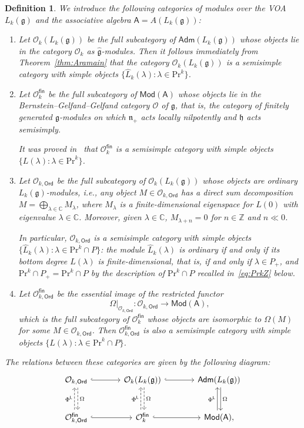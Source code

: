 \documentclass[12pt,a4paper,reqno]{amsart}
\numberwithin{equation}{section}
\newtheorem{definition}[theorem]{Definition}
\theoremstyle{definition}
\newcommand{\g}{\mathfrak{g}}
\newcommand{\C}{\mathbb{C}}
\newcommand{\Z}{\mathbb{Z}}
\def\O{\mathcal{O}}
\def\Ord{\mathsf{Ord}}
\def\Adm{\mathsf{Adm}}
\def\Mod{\mathsf{Mod}}
\def\fin{\mathsf{fin}}
\def\L{\mathsf{L}}
\def\Om{\Omega}
\def\Pr{\mathrm{Pr}}
\def\la{\lambda}
\def \h{\mathfrak{h}}
\def\A{\mathsf{A}}
\begin{document}
\begin{definition}\label{def:cats}
We introduce the following categories of modules over the VOA $L_k(\g)$ and the associative algebra $\A = A(L_k(\g))$:
\begin{enumerate}
    \item Let $\O_k(L_k(\g))$ be the full subcategory of $\Adm(L_k(\g))$ whose objects lie in the category $\O_k$ as $\hat{\g}$-modules.
Then it follows immediately from Theorem~\ref{thm:Aramain} that the category $\O_k(L_k(\g))$ is a semisimple category with simple objects $\{\hat{L}_k(\la):\la\in \Pr^k\}$.
\item Let $\O^\fin_k$ be the full subcategory of $\Mod(\A)$ whose objects lie in the Bernstein--Gelfand--Gelfand category $\O$ of $\g$, that is, the category of finitely generated $\g$-modules on which $\mathfrak{n}_+$ acts locally nilpotently and $\h$ acts semisimply.

It was proved in~\cite[Corollary 3.2]{AvE} that $\O^\fin_k$ is a semisimple category with simple objects $\{L(\la): \la\in \Pr^k\}$.
\item Let $\O_{k,\Ord}$ be the full subcategory of $\O_k(L_k(\g))$ whose objects are ordinary $L_k(\g)$-modules, i.e., any object $M\in \O_{k,\Ord}$ has a direct sum decomposition $M=\bigoplus_{\la\in \C} M_\la$, where $M_\la$ is a finite-dimensional eigenspace for $L(0)$ with eigenvalue $\la\in \C$. Moreover, given $\la\in \C$, $M_{\la+n}=0$ for $n\in \Z$ and $n\ll0$.

In particular, $\O_{k,\Ord}$ is a semisimple category with simple objects $\{\hat{L}_k(\la):\la\in \Pr^k\cap P\}$: the module $\hat{L}_k(\la)$ is ordinary if and only if its bottom degree $L(\la)$ is finite-dimensional, that is, if and only if $\la\in P_+$, and $\Pr^k\cap P_+=\Pr^k\cap P$ by the description of $\Pr^k\cap P$ recalled in~\eqref{eq:PrkZ} below.

\item Let $\O^{\fin}_{k,\Ord}$ be  the essential image of the restricted functor \[\Omega\big|_{\O_{k,\Ord}}\colon\mathcal O_{k,\Ord}\longrightarrow \Mod(\A),\]
which is the full subcategory of $\O^\fin_k$ whose objects are isomorphic to  $\Om(M)$ for some $M\in \O_{k,\Ord}$. Then $\O^{\fin}_{k,\Ord}$ is also a semisimple category with simple objects $\{L(\la): \la\in \Pr^k\cap P\} $.

\end{enumerate}
The relations between these categories are given by the following diagram:
\begin{equation}
  \begin{tikzcd}[row sep=large, column sep=large]
\O_{k,\Ord}\arrow[r,hook]\arrow[d,"\Om", dashed, shift left =2pt]&\arrow[d, dashed, shift left =2pt,"\Om"]\O_{k}(L_k(\g))\arrow[r,hook]&\mathsf{Adm}(L_k(\g))\arrow[d,"\Om", shift left =2pt]\\
\O^{\fin}_{k,\Ord}\arrow[r,hook]\arrow[u,dashed,"\Phi^\L",shift left = 2pt]& \O^{\fin}_{k} \arrow[r,hook]\arrow[u,dashed,"\Phi^\L",shift left = 2pt]& \Mod(\A),\arrow[u,"\Phi^\L",shift left = 2pt]
\end{tikzcd}
\end{equation}


\end{definition}
\end{document}
